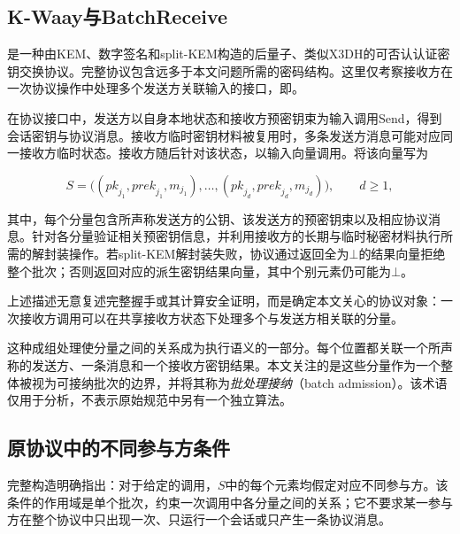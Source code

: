 \subsection{K-Waay与BatchReceive}

\kwaay 是一种由KEM、数字签名和split-KEM构造的后量子、类似X3DH的可否认认证密钥交换协议\cite{collins2024kwaay}。完整协议包含远多于本文问题所需的密码结构。这里仅考察接收方在一次协议操作中处理多个发送方关联输入的接口，即\batchreceive。

在协议接口中，发送方以自身本地状态和接收方预密钥束为输入调用\textsf{Send}，得到会话密钥与协议消息。接收方临时密钥材料被复用时，多条发送方消息可能对应同一接收方临时状态。接收方随后针对该状态，以输入向量调用\batchreceive\cite[第4.1节]{collins2024kwaayfull}。将该向量写为

\begin{equation}
  S = \bigl((\mathit{pk}_{j_1},\mathit{prek}_{j_1},m_{j_1}),\ldots,
             (\mathit{pk}_{j_d},\mathit{prek}_{j_d},m_{j_d})\bigr),
  \qquad d \geq 1,
  \label{eq:kwaay-batch-input}
\end{equation}

其中，每个分量包含所声称发送方的公钥、该发送方的预密钥束以及相应协议消息。\batchreceive 针对各分量验证相关预密钥信息，并利用接收方的长期与临时秘密材料执行所需的解封装操作。若split-KEM解封装失败，协议通过返回全为$\bot$的结果向量拒绝整个批次；否则返回对应的派生密钥结果向量，其中个别元素仍可能为$\bot$\cite[第5.1节，图10]{collins2024kwaayfull}。

上述描述无意复述完整握手或其计算安全证明，而是确定本文关心的协议对象：一次接收方调用可以在共享接收方状态下处理多个与发送方相关联的分量。

这种成组处理使分量之间的关系成为执行语义的一部分。每个位置都关联一个所声称的发送方、一条消息和一个接收方密钥结果。本文关注的是这些分量作为一个整体被视为可接纳批次的边界，并将其称为\emph{批处理接纳}（batch admission）。该术语仅用于分析，不表示原始\kwaay 规范中另有一个独立算法。

\subsection{原协议中的不同参与方条件}

\kwaay 完整构造明确指出：对于给定的\batchreceive 调用，$S$中的每个元素均假定对应不同参与方\cite[第5.1节，第21页，图10之后]{collins2024kwaayfull}。该条件的作用域是单个批次，约束一次\batchreceive 调用中各分量之间的关系；它不要求某一参与方在整个协议中只出现一次、只运行一个会话或只产生一条协议消息。

